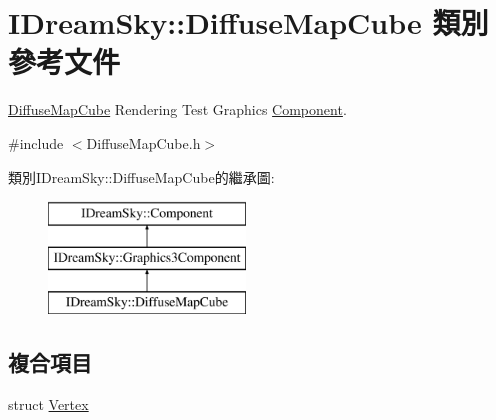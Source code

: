 \hypertarget{class_i_dream_sky_1_1_diffuse_map_cube}{}\section{I\+Dream\+Sky\+:\+:Diffuse\+Map\+Cube 類別 參考文件}
\label{class_i_dream_sky_1_1_diffuse_map_cube}


\hyperlink{class_i_dream_sky_1_1_diffuse_map_cube}{Diffuse\+Map\+Cube} Rendering Test Graphics \hyperlink{class_i_dream_sky_1_1_component}{Component}.  




{\ttfamily \#include $<$Diffuse\+Map\+Cube.\+h$>$}

類別\+I\+Dream\+Sky\+:\+:Diffuse\+Map\+Cube的繼承圖\+:\begin{figure}[H]
\begin{center}
\leavevmode
\includegraphics[height=3.000000cm]{class_i_dream_sky_1_1_diffuse_map_cube}
\end{center}
\end{figure}
\subsection*{複合項目}
\begin{DoxyCompactItemize}
\item 
struct \hyperlink{struct_i_dream_sky_1_1_diffuse_map_cube_1_1_vertex}{Vertex}
\end{DoxyCompactItemize}
